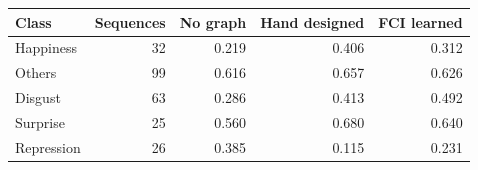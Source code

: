 \begin{tabular}{lrrrr}
\toprule
Class & Sequences & No graph & Hand designed & FCI learned \\
\midrule
Happiness & 32 & 0.219 & 0.406 & 0.312 \\
Others & 99 & 0.616 & 0.657 & 0.626 \\
Disgust & 63 & 0.286 & 0.413 & 0.492 \\
Surprise & 25 & 0.560 & 0.680 & 0.640 \\
Repression & 26 & 0.385 & 0.115 & 0.231 \\
\bottomrule
\end{tabular}
